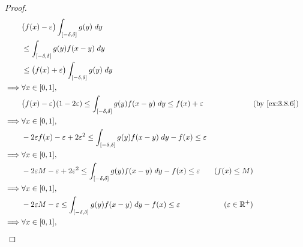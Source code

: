 \begin{proof}
\begin{align*}
             & \big(f(x) - \varepsilon\big) \int_{[-\delta, \delta]} g(y) \; dy                                                                                                                \\
             & \leq \int_{[-\delta, \delta]} g(y) f(x - y) \; dy                                                                                                                               \\
             & \leq \big(f(x) + \varepsilon\big) \int_{[-\delta, \delta]} g(y) \; dy                                                                                                           \\
    \implies & \forall x \in [0, 1],                                                                                                                                                           \\
             & \big(f(x) - \varepsilon\big) (1 - 2 \varepsilon) \leq \int_{[-\delta, \delta]} g(y) f(x - y) \; dy \leq f(x) + \varepsilon    &                        & \by{ex:3.8.6}          \\
    \implies & \forall x \in [0, 1],                                                                                                                                                           \\
             & -2 \varepsilon f(x) - \varepsilon + 2 \varepsilon^2 \leq \int_{[-\delta, \delta]} g(y) f(x - y) \; dy - f(x) \leq \varepsilon                                                   \\
    \implies & \forall x \in [0, 1],                                                                                                                                                           \\
             & -2 \varepsilon M - \varepsilon + 2 \varepsilon^2 \leq \int_{[-\delta, \delta]} g(y) f(x - y) \; dy - f(x) \leq \varepsilon    & (f(x) \leq M)                                   \\
    \implies & \forall x \in [0, 1],                                                                                                                                                           \\
             & -2 \varepsilon M - \varepsilon \leq \int_{[-\delta, \delta]} g(y) f(x - y) \; dy - f(x) \leq \varepsilon                      & (\varepsilon \in \R^+)                          \\
    \implies & \forall x \in [0, 1],                                                                                                                                                           \\

\end{align*}
\end{proof}
